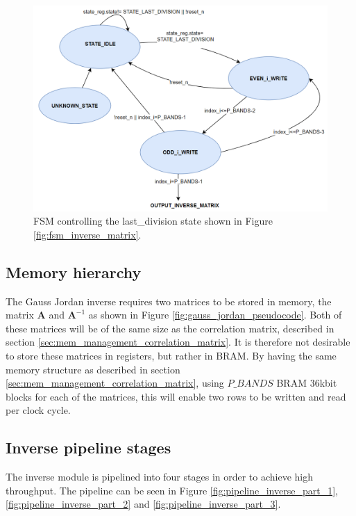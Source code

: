 \begin{figure}[H]
\centering
   \includegraphics[scale=0.5]{images/inverse_hw/fsm_last_division.PNG}
  \caption{FSM controlling the last\_division state shown in Figure \ref{fig:fsm_inverse_matrix}.  } 
  \label{fig:fsm_last_division}
\end{figure}

\subsection{Memory hierarchy}
The Gauss Jordan inverse requires two matrices to be stored in memory, the matrix $\textbf{A}$ and $\textbf{A}^{-1}$ as shown in Figure \ref{fig:gauss_jordan_pseudocode}. Both of these matrices will be of the same size as the correlation matrix, described in section \ref{sec:mem_management_correlation_matrix}. It is therefore not desirable to store these matrices in registers, but rather in BRAM. By having the same memory structure as described in section \ref{sec:mem_management_correlation_matrix}, using $P\_BANDS$ BRAM 36kbit blocks for each of the matrices, this will enable two rows to be written and read per clock cycle. 

\subsection{Inverse pipeline stages}
The inverse module is pipelined into four stages in order to achieve high throughput. The pipeline can be seen in Figure \ref{fig:pipeline_inverse_part_1}, \ref{fig:pipeline_inverse_part_2} and \ref{fig:pipeline_inverse_part_3}.

